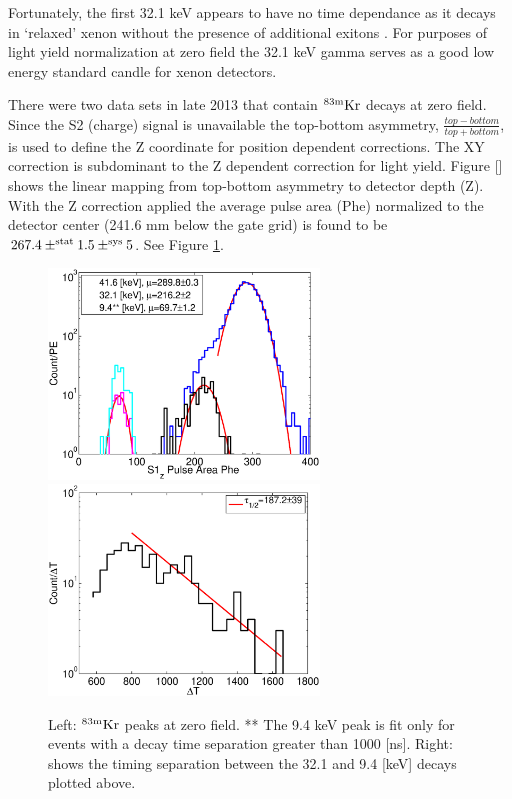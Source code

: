 Fortunately, the first 32.1 keV appears to have no time dependance as it decays in `relaxed' xenon without the presence of additional exitons \cite{Aprile_LY}. For purposes of light yield normalization at zero field the 32.1 keV gamma serves as a good low energy standard candle for xenon detectors.

There were two data sets in late 2013 that contain $\rm^{83m}Kr$ decays at zero field. Since the S2 (charge) signal is unavailable the top-bottom asymmetry, $\frac{top-bottom}{top+bottom} $, is used to define the Z coordinate for position dependent corrections. The XY correction is subdominant to the Z dependent correction for light yield. Figure [] shows the linear mapping from top-bottom asymmetry to detector depth (Z). With the Z correction applied the average pulse area (Phe) normalized to the detector center (241.6 mm below the gate grid) is found to be $\rm 267.4 \pm^{stat} 1.5 \pm^{sys} 5$. See Figure \ref{fig:ZeroField_Kr}.

 
 \begin{figure}[h!]\centering
\includegraphics[width=72mm]{Recombination_LY_QY/Figures/S1_Z_no_field_lux10_20131009T1358_cp09670} %
\includegraphics[width=72mm]{Recombination_LY_QY/Figures/dT_no_field_2lux10_20131009T1358_cp09670}
\caption{Left: $\rm^{83m}Kr$ peaks at zero field. ** The 9.4 keV peak is fit only for events with a decay time separation greater than 1000 [ns]. Right: shows the timing separation between the 32.1 and 9.4 [keV] decays plotted above.}
\label{fig:ZeroField_Kr}
\end{figure}
 
